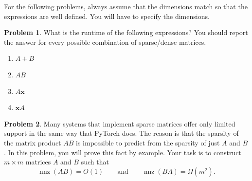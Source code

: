 \documentclass[10pt]{article}
\theoremstyle{definition}
\newtheorem{problem}{Problem}
\DeclareMathOperator{\nnz}{nnz}
\newcommand{\trans}[1]{{#1}^{T}}
\newcommand{\x}{\mathbf x}
\begin{document}
\newpage
For the following problems, always assume that the dimensions match so that the expressions are well defined.
You will have to specify the dimensions.

\begin{problem}
    What is the runtime of the following expressions?
    You should report the answer for every possible combination of sparse/dense matrices.

    \begin{enumerate}
        \item
            $A + B$
            \vspace{2in}
        \item
            $AB$
            \vspace{2in}
        \item
            $A\x$
            \vspace{2in}
        \item
            $\x A$
            \vspace{2in}
    \end{enumerate}
\end{problem}


\newpage
\begin{problem}
    Many systems that implement sparse matrices offer only limited support in the same way that PyTorch does.
    The reason is that the sparsity of the matrix product $AB$ is impossible to predict from the sparsity of just $A$ and $B$.
    In this problem, you will prove this fact by example.
    Your task is to construct $m\times m$ matrices $A$ and $B$ such that
    \begin{equation}
        \nnz(AB) = O(1)
        \qquad
        \text{and}
        \qquad
        \nnz(BA) = \Omega(m^2)
        .
    \end{equation}
    \vspace{3in}
\end{problem}
\end{document}
